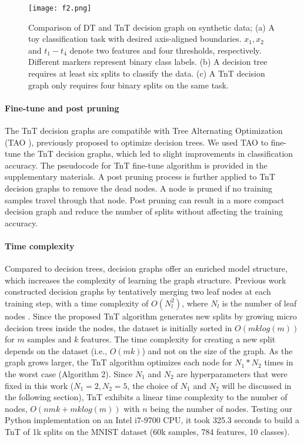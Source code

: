 \documentclass{article}
\begin{document}
\begin{figure}[h]
  \centering
  \texttt{[image: f2.png]}
  \vspace{-3mm}
  \caption{Comparison of DT and TnT decision graph on synthetic data; (a) A toy classification task with desired axis-aligned boundaries. $x_1, x_2$ and $t_{1}-t_{4}$ denote two features and four thresholds, respectively. Different markers represent binary class labels. (b) A decision tree requires at least six splits to classify the data. (c) A TnT decision graph only requires four binary splits on the same task.}
  \vspace{-2mm}
  \label{f2}
\end{figure}

\vspace{-2mm}
\paragraph{Fine-tune and post pruning} The TnT decision graphs are compatible with Tree Alternating Optimization (TAO \cite{carreira2018alternating}), previously proposed to optimize decision trees. We used TAO to fine-tune the TnT decision graphs, which led to slight improvements in classification accuracy. The pseudocode for  TnT fine-tune algorithm is provided in the supplementary materials. A post pruning process is further applied to TnT decision graphs to remove the dead nodes. A node is pruned if no training samples travel through that node. Post pruning can result in a more compact decision graph and reduce the number of splits without affecting the training accuracy.
\vspace{-2mm}
\paragraph{Time complexity} Compared to decision trees, decision graphs offer an enriched model structure, which increases the complexity of learning the graph structure. Previous work constructed decision graphs by tentatively merging two leaf nodes at each training step, with a time complexity of $O(N_{l}^{2})$, where $N_{l}$ is the number of leaf nodes \cite{oliver1992decision}. Since the proposed TnT algorithm generates new splits by growing micro decision trees inside the nodes, the dataset is initially sorted in $O(mklog(m))$ for $m$ samples and $k$ features. The time complexity for creating a new split depends on the dataset (i.e., $O(mk)$) and not on the size of the graph. As the graph grows larger, the  TnT algorithm  optimizes each node for $N_1*N_2$ times in the worst case (Algorithm 2). Since $N_1$ and $N_2$ are hyperparameters that were fixed in this work ($N_1=2, N_2=5$, the choice of $N_1$ and $N_2$ will be discussed in the following section), TnT exhibits a linear time complexity to the number of nodes, $O(nmk+mklog(m))$ with $n$ being the number of nodes. Testing our Python implementation on an Intel i7-9700 CPU, it took 325.3 seconds to build a TnT of 1k splits on the MNIST dataset (60k samples, 784 features, 10 classes).
\end{document}
